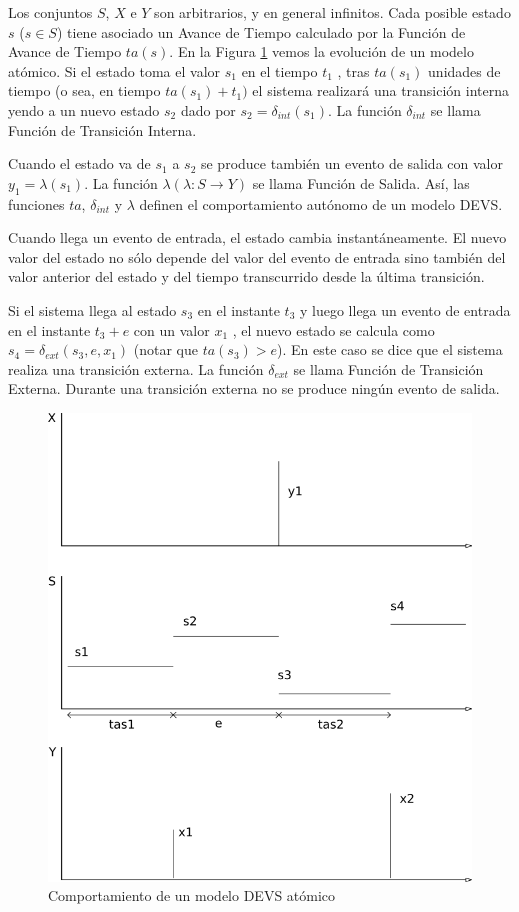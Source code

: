 	Los conjuntos $S$, $X$ e $Y$ son arbitrarios, y en general infinitos. Cada posible estado $s$ ($s \in S$) tiene asociado un Avance de Tiempo calculado 
	por la Función de Avance de Tiempo $ta(s)$.
	En la Figura \ref{fig:fig2-5} vemos la evolución de un modelo atómico. Si el estado toma el valor $s_1$ en el tiempo $t_1$ , tras $ta(s_1)$ unidades de 
	tiempo (o sea, en tiempo $ta(s_1 ) + t_1 )$ el sistema realizará una transición interna yendo a un nuevo estado $s_2$ dado por $s_2 = \delta_{int} (s_1 )$. 
	La función $\delta_{int}$ se llama Función de Transición Interna.

	Cuando el estado va de $s_1$ a $s_2$ se produce también un evento de salida con valor $y_1 = \lambda(s_1)$. La función $\lambda (\lambda : S \to Y )$ se 
	llama Función de Salida. Así, las funciones $ta$, $\delta_{int}$ y $\lambda$ definen el comportamiento autónomo de un modelo DEVS.

	Cuando llega un evento de entrada, el estado cambia instantáneamente. El nuevo valor del estado no sólo depende del valor del evento de entrada sino 
	también del valor anterior del estado y del tiempo transcurrido desde la última transición.

	Si el sistema llega al estado $s_3$ en el instante $t_3$ y luego llega un evento de entrada en el instante $t_3 + e$ con un valor $x_1$ , el nuevo estado 
	se calcula como $s_4 = \delta_{ext} (s_3 , e, x_1 )$ (notar que $ta(s_3 ) > e$). En este caso se dice que el sistema realiza una transición externa. 
	La función $\delta_{ext}$ se llama Función de Transición Externa. Durante una transición externa no se produce ningún evento de salida.

	\begin{figure}[!htbp]
	  \includegraphics[scale=0.5]{devs-atomic}
	  \caption{Comportamiento de un modelo DEVS atómico}
	   \label{fig:fig2-5}
	\end{figure}


